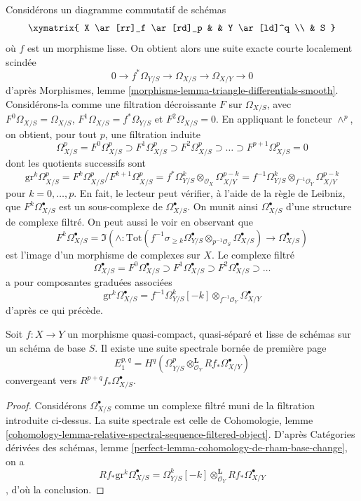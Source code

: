 \noindent
Considérons un diagramme commutatif de schémas
$$
\xymatrix{
X \ar[rr]_f \ar[rd]_p & & Y \ar[ld]^q \\
& S
}
$$
où $f$ est un morphisme lisse. On obtient alors une suite exacte courte
localement scindée
$$
0 \to f^*\Omega_{Y/S} \to \Omega_{X/S} \to \Omega_{X/Y} \to 0
$$
d'après Morphismes, lemme \ref{morphisms-lemma-triangle-differentials-smooth}.
Considérons-la comme une filtration décroissante $F$ sur $\Omega_{X/S}$,
avec $F^0\Omega_{X/S} = \Omega_{X/S}$, $F^1\Omega_{X/S} = f^*\Omega_{Y/S}$ et
$F^2\Omega_{X/S} = 0$. En appliquant le foncteur $\wedge^p$, on obtient,
pour tout $p$, une filtration induite
$$
\Omega^p_{X/S} = F^0\Omega^p_{X/S} \supset
F^1\Omega^p_{X/S} \supset
F^2\Omega^p_{X/S} \supset \ldots \supset F^{p + 1}\Omega^p_{X/S} = 0
$$
dont les quotients successifs sont
$$
\text{gr}^k\Omega^p_{X/S} =
F^k\Omega^p_{X/S}/F^{k + 1}\Omega^p_{X/S} =
f^*\Omega^k_{Y/S} \otimes_{\mathcal{O}_X} \Omega^{p - k}_{X/Y} =
f^{-1}\Omega^k_{Y/S} \otimes_{f^{-1}\mathcal{O}_Y} \Omega^{p - k}_{X/Y}
$$
pour $k = 0, \ldots, p$. En fait, le lecteur peut vérifier, à l'aide de la
règle de Leibniz, que $F^k\Omega^\bullet_{X/S}$ est un sous-complexe de
$\Omega^\bullet_{X/S}$. On munit ainsi $\Omega^\bullet_{X/S}$
d'une structure de complexe filtré. On peut aussi le voir en observant
que
$$
F^k\Omega^\bullet_{X/S} =
\Im\left(\wedge :
\text{Tot}(
f^{-1}\sigma_{\geq k}\Omega^\bullet_{Y/S} \otimes_{p^{-1}\mathcal{O}_S}
\Omega^\bullet_{X/S})
\longrightarrow
\Omega^\bullet_{X/S}\right)
$$
est l'image d'un morphisme de complexes sur $X$. Le complexe filtré
$$
\Omega^\bullet_{X/S} = F^0\Omega^\bullet_{X/S} \supset
F^1\Omega^\bullet_{X/S} \supset F^2\Omega^\bullet_{X/S} \supset \ldots
$$
a pour composantes graduées associées
$$
\text{gr}^k\Omega^\bullet_{X/S} = 
f^{-1}\Omega^k_{Y/S}[-k] \otimes_{f^{-1}\mathcal{O}_Y} \Omega^\bullet_{X/Y}
$$
d'après ce qui précède.

\begin{lemma}
\label{lemma-spectral-sequence-smooth}
Soit $f : X \to Y$ un morphisme quasi-compact, quasi-séparé et lisse
de schémas sur un schéma de base $S$. Il existe une suite spectrale bornée
de première page
$$
E_1^{p, q} =
H^q(\Omega^p_{Y/S} \otimes_{\mathcal{O}_Y}^\mathbf{L} Rf_*\Omega^\bullet_{X/Y})
$$
convergeant vers $R^{p + q}f_*\Omega^\bullet_{X/S}$.
\end{lemma}

\begin{proof}
Considérons $\Omega^\bullet_{X/S}$ comme un complexe filtré muni de la
filtration introduite ci-dessus. La suite spectrale est celle de
Cohomologie, lemme
\ref{cohomology-lemma-relative-spectral-sequence-filtered-object}.
D'après Catégories dérivées des schémas, lemme
\ref{perfect-lemma-cohomology-de-rham-base-change}, on a
$$
Rf_*\text{gr}^k\Omega^\bullet_{X/S} =
\Omega^k_{Y/S}[-k] \otimes_{\mathcal{O}_Y}^\mathbf{L} Rf_*\Omega^\bullet_{X/Y}
$$,
d'où la conclusion.
\end{proof}

